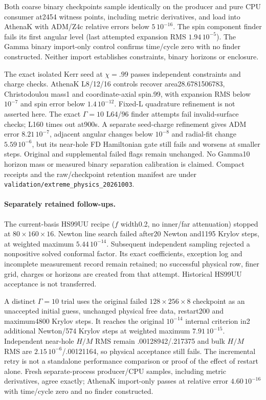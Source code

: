 \documentclass[11pt]{article}
\begin{document}
Both coarse binary checkpoints sample identically on the producer and pure
CPU consumer at2454 witness points, including metric derivatives, and load
into AthenaK with ADM/Z4c relative errors below $5\,10^{-16}$.
The spin component finder fails its first angular level (last attempted
expansion RMS $1.94\,10^{-5}$). The Gamma binary import-only control confirms
time/cycle zero with no finder constructed. Neither import establishes
constraints, binary horizons or enclosure.

The exact isolated Kerr seed at $\chi=.99$ passes independent constraints
and charge checks. AthenaK L8/12/16 controls recover area28.6781506783,
Christodoulou mass1 and coordinate-axial spin.99, with expansion RMS below $10^{-7}$ and spin error below
$1.4\,10^{-12}$. Fixed-L quadrature refinement is not asserted here.
The exact $\Gamma=10$ L64/96 finder attempts fail invalid-surface checks;
L160 times out at900s. A separate seed-charge refinement gives ADM error
$8.21\,10^{-7}$, adjacent angular changes below $10^{-8}$ and radial-fit
change $5.59\,10^{-6}$, but its near-hole FD Hamiltonian gate still fails
and worsens at smaller steps. Original and supplemental failed flags remain
unchanged. No Gamma10 horizon mass or measured binary separation calibration
is claimed. Compact receipts and the raw/checkpoint retention manifest are
under \nolinkurl{validation/extreme_physics_20261003}.
\paragraph{Separately retained follow-ups.}
The current-basis HS99UU recipe ($f$ width0.2, no inner/far attenuation)
stopped at $80\times160\times16$. Newton line search failed after20 Newton
and1195 Krylov steps, at weighted maximum $5.44\,10^{-14}$. Subsequent
independent sampling rejected a nonpositive solved conformal factor. Its
exact coefficients, exception log and incomplete measurement record remain
retained; no successful physical row, finer grid, charges or horizons are
created from that attempt. Historical HS99UU acceptance is not transferred.

A distinct $\Gamma=10$ trial uses the original failed
$128\times256\times8$ checkpoint as an unaccepted initial guess, unchanged
physical free data, restart200 and maximum4800 Krylov steps. It reaches the
original $10^{-14}$ internal criterion in2 additional Newton/574 Krylov steps
at weighted maximum $7.91\,10^{-15}$. Independent near-hole $H/M$ RMS remain
.00128942/.217375 and bulk $H/M$ RMS are $2.15\,10^{-6}$/.00121164, so
physical acceptance still fails. The incremental retry is not a standalone
performance comparison or proof of the effect of restart alone.
Fresh separate-process producer/CPU samples, including metric derivatives,
agree exactly; AthenaK import-only passes at relative error
$4.60\,10^{-16}$ with time/cycle zero and no finder constructed.
\end{document}
